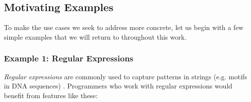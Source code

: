 \subsection{Motivating Examples}\label{sec:examples}
To make the use cases we seek to address more concrete, let us begin with a few simple examples that we will return to throughout this work.

\subsubsection{Example 1: Regular Expressions}\label{sec:regex}
\emph{Regular expressions} are commonly used to capture patterns in strings (e.g. motifs in DNA sequences) \cite{Thompson:1968:PTR:363347.363387}. Programmers who work with regular expressions would benefit from features like these:

